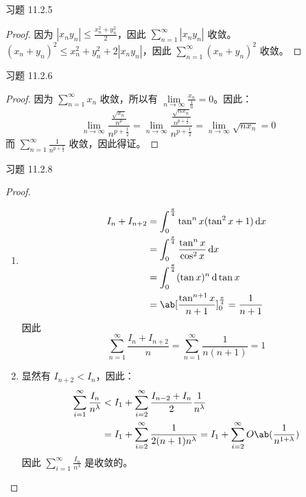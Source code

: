 \begin{problem}
    习题 11.2.5
    \begin{proof}
        因为 $|x_n y_n| \le \frac{x_n^2 + y_n^2}{2}$，因此 $\sum\limits_{n = 1}^{\infty} |x_n y_n|$ 收敛。$(x_n + y_n)^2 \le x_n^2 + y_n^2 + 2|x_n y_n|$，因此 $\sum\limits_{n = 1}^\infty (x_n + y_n)^2$ 收敛。
    \end{proof}
\end{problem}

\begin{problem}
    习题 11.2.6
    \begin{proof}
        因为 $\sum\limits_{n = 1}^{\infty} x_n$ 收敛，所以有 $\lim\limits_{n \to \infty} \frac{x_n}{\frac{1}{n}} = 0$。因此：
        $$
        \lim_{n \to \infty} \frac{\frac{\sqrt{x_n}}{n^{p}}}{n^{p + \frac{1}{2}}} = \lim_{n \to \infty} \frac{\frac{\sqrt{n x_n}}{n^{p + \frac{1}{2}}}}{n^{p + \frac{1}{2}}} = \lim_{n \to \infty} \sqrt{n x_n} = 0
        $$
        而 $\sum\limits_{n = 1}^{\infty} \frac{1}{n^{p + \frac{1}{2}}}$ 收敛，因此得证。
    \end{proof}
\end{problem}

\begin{problem}
    习题 11.2.8
    \begin{proof}
        \begin{enumerate}
            \item[\textbf{1)}]
            $$
            \begin{aligned}
                I_n + I_{n + 2} & = \int_0^{\frac{\pi}{4}} \tan^n x (\tan^2 x + 1) \dd{x} \\
                & = \int_0^{\frac{\pi}{4}} \frac{\tan^n x}{\cos^2 x} \dd{x} \\
                & = \int_0^{\frac{\pi}{4}} (\tan x)^n \dd{\tan x} \\
                & = \ab[\frac{\tan^{n + 1} x}{n + 1}]_0^{\frac{\pi}{4}} = \frac{1}{n + 1}
            \end{aligned}
            $$
            因此
            $$
            \sum_{n = 1}^{\infty} \frac{I_n + I_{n + 2}}{n} = \sum_{n = 1}^{\infty} \frac{1}{n(n + 1)} = 1
            $$
            
            \item[\textbf{2)}] 显然有 $I_{n + 2} < I_n$，因此：
            $$
            \begin{aligned}
                \sum_{i = 1}^{\infty} \frac{I_n}{n^{\lambda}} & < I_1 + \sum_{i = 2}^{\infty} \frac{I_{n - 2} + I_{n}}{2} \frac{1}{n^{\lambda}} \\
                & = I_1 + \sum_{i = 2}^{\infty} \frac{1}{2 (n + 1) n^{\lambda}} = I_1 + \sum_{i = 2}^{\infty} O\ab(\frac{1}{n^{1 + \lambda}})
            \end{aligned}
            $$
            因此 $\sum\limits_{i = 1}^{\infty} \frac{I_n}{n^{\lambda}}$ 是收敛的。
        \end{enumerate}
    \end{proof}
\end{problem}

